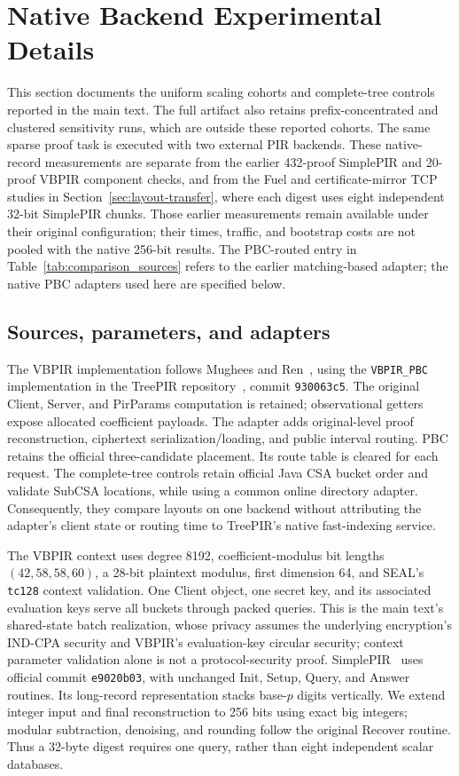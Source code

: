\section{Native Backend Experimental Details}
\label{sec:external-native-evidence}

This section documents the uniform scaling cohorts and complete-tree controls reported in the main text. The full artifact also retains prefix-concentrated and clustered sensitivity runs, which are outside these reported cohorts. The same sparse proof task is executed with two external PIR backends. These native-record measurements are separate from the earlier 432-proof SimplePIR and 20-proof VBPIR component checks, and from the Fuel and certificate-mirror TCP studies in Section~\ref{sec:layout-transfer}, where each digest uses eight independent 32-bit SimplePIR chunks. Those earlier measurements remain available under their original configuration; their times, traffic, and bootstrap costs are not pooled with the native 256-bit results. The PBC-routed entry in Table~\ref{tab:comparison_sources} refers to the earlier matching-based adapter; the native PBC adapters used here are specified below.

\subsection{Sources, parameters, and adapters}

The VBPIR implementation follows Mughees and Ren~\cite{vectorbatchpir}, using the \texttt{VBPIR\_PBC} implementation in the TreePIR repository~\cite{treepir}, commit \texttt{930063c5}. The original Client, Server, and PirParams computation is retained; observational getters expose allocated coefficient payloads. The adapter adds original-level proof reconstruction, ciphertext serialization/loading, and public interval routing. PBC retains the official three-candidate placement. Its route table is cleared for each request. The complete-tree controls retain official Java CSA bucket order and validate SubCSA locations, while using a common online directory adapter. Consequently, they compare layouts on one backend without attributing the adapter's client state or routing time to TreePIR's native fast-indexing service.

The VBPIR context uses degree 8192, coefficient-modulus bit lengths $(42,58,58,60)$, a 28-bit plaintext modulus, first dimension 64, and SEAL's \texttt{tc128} context validation. One Client object, one secret key, and its associated evaluation keys serve all buckets through packed queries. This is the main text's shared-state batch realization, whose privacy assumes the underlying encryption's IND-CPA security and VBPIR's evaluation-key circular security; context parameter validation alone is not a protocol-security proof. SimplePIR~\cite{simplepir} uses official commit \texttt{e9020b03}, with unchanged Init, Setup, Query, and Answer routines. Its long-record representation stacks base-$p$ digits vertically. We extend integer input and final reconstruction to 256 bits using exact big integers; modular subtraction, denoising, and rounding follow the original Recover routine. Thus a 32-byte digest requires one query, rather than eight independent scalar databases.

